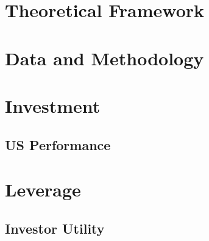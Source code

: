 \documentclass[mnsc,blindrev]{informs3} %
\begin{document}
%
%
%

%
%
%
%
%
%

%



\section{Theoretical Framework} \label{sec:theory}



\section{Data and Methodology} \label{sec:Data}



\section{Investment} \label{sec:asset_allocation}



\subsection{US Performance} \label{sec:port_performance}



\section{Leverage} \label{sec:leverage}



\subsection{Investor Utility} \label{sec:invest_util}
\end{document}
